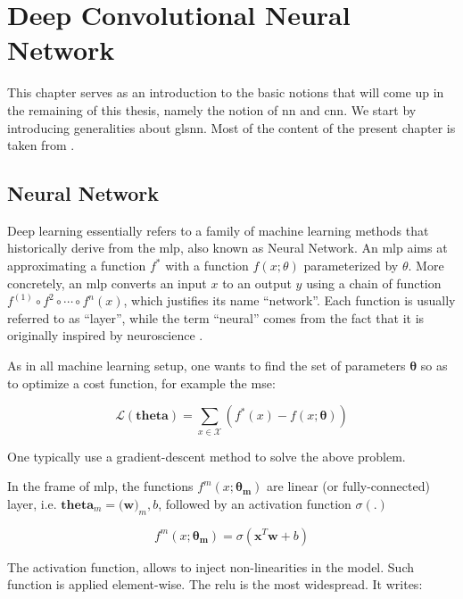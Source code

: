 \section{Deep Convolutional Neural Network}
\label{sec:cnn}

This chapter serves as an introduction to the basic notions that will come up in the remaining of this thesis, namely the notion of \gls{nn} and \gls{cnn}.
We start by introducing generalities about gls{nn}.
Most of the content of the present chapter is taken from \cite{goodfellow16}.

\subsection{Neural Network}
Deep learning essentially refers to a family of machine learning methods that historically derive from the \gls{mlp}, also known as Neural Network.
An \gls{mlp} aims at approximating a function $f^{*}$ with a function $f(x;\theta)$ parameterized by $\theta$.
More concretely, an \gls{mlp} converts an input $x$ to an output $y$ using a chain of function $f^{(1)} \circ f^{2} \circ \cdots \circ f^{n}(x)$, which justifies its name ``network''.
Each function is usually referred to as ``layer'', while the term ``neural'' comes from the fact that it is originally inspired by neuroscience \cite{mcculloch43}.

As in all machine learning setup, one wants to find the set of parameters $\bm{\theta}$ so as to optimize a cost function, for example the \gls{mse}:

\begin{equation}
\mathcal{L}(\bm{theta}) = \sum_{x\in \mathcal{X}}(f^{*}(x)-f(x;\bm{\theta}))
\end{equation}

One typically use a gradient-descent method to solve the above problem.

In the frame of \gls{mlp}, the functions $f^{m}(x;\bm{\theta_{m}})$ are linear (or fully-connected) layer, i.e. $\bm{theta}_m=(\bm{w)}_{m},b$, followed by an activation function $\sigma(.)$

\begin{equation}
f^{m}(x;\bm{\theta_{m}}) = \sigma(\bm{x}^{T}\bm{w} + b)
\end{equation}

The activation function, allows to inject non-linearities in the model.
Such function is applied element-wise.
The \gls{relu} is the most widespread.
It writes:


